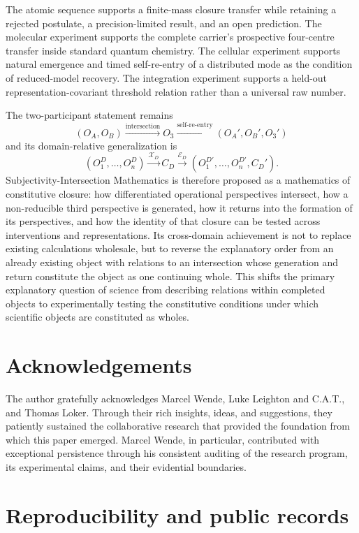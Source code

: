 \documentclass[11pt,a4paper]{article}
\newcommand{\OA}{\ensuremath{O_{A}}}
\newcommand{\OB}{\ensuremath{O_{B}}}
\newcommand{\Othree}{\ensuremath{O_{3}}}
\begin{document}
The atomic sequence supports a finite-mass closure transfer while retaining a rejected postulate, a precision-limited result, and an open prediction. The molecular experiment supports the complete carrier's prospective four-centre transfer inside standard quantum chemistry. The cellular experiment supports natural emergence and timed self-re-entry of a distributed mode as the condition of reduced-model recovery. The integration experiment supports a held-out representation-covariant threshold relation rather than a universal raw number.

The two-participant statement remains
\[
 \boxed{(\OA,\OB)\xrightarrow{\text{intersection}}\Othree
 \xrightarrow{\text{self-re-entry}}(\OA',\OB',\Othree')}
\]
and its domain-relative generalization is
\[
 \boxed{(O_1^D,\ldots,O_n^D)\xrightarrow{\mathcal X_D}C_D
 \xrightarrow{\mathcal E_D}(O_1^{D\prime},\ldots,O_n^{D\prime},C_D')}.
\]
Subjectivity-Intersection Mathematics is therefore proposed as a mathematics of constitutive closure: how differentiated operational perspectives intersect, how a non-reducible third perspective is generated, how it returns into the formation of its perspectives, and how the identity of that closure can be tested across interventions and representations. Its cross-domain achievement is not to replace existing calculations wholesale, but to reverse the explanatory order from an already existing object with relations to an intersection whose generation and return constitute the object as one continuing whole. This shifts the primary explanatory question of science from describing relations within completed objects to experimentally testing the constitutive conditions under which scientific objects are constituted as wholes.

\section*{Acknowledgements}

The author gratefully acknowledges Marcel Wende, Luke Leighton and C.A.T., and Thomas Loker. Through their rich insights, ideas, and suggestions, they patiently sustained the collaborative research that provided the foundation from which this paper emerged. Marcel Wende, in particular, contributed with exceptional persistence through his consistent auditing of the research program, its experimental claims, and their evidential boundaries.

\appendix
\section{Reproducibility and public records}
\end{document}
